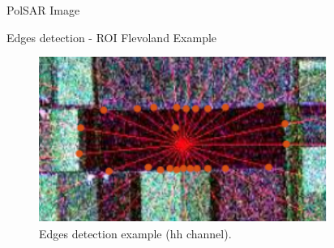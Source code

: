 \documentclass[10pt]{beamer}
\begin{document}
\begin{frame}[fragile]{PolSAR Image}
\begin{alertblock}{Edges detection - ROI Flevoland Example} 
\begin{figure}[hbt]
\centering
	\includegraphics[width=.7\linewidth]{flevoland_radial_25_point_hh_crop}
	\caption{Edges detection example ($\text{hh}$ channel).}
\label{fig1}
\end{figure}
\end{alertblock}
\end{frame}

\end{document}
